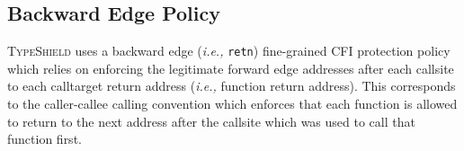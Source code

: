 \subsection{Backward Edge Policy}
\label{Backward Edge CFI Policy}
\textsc{TypeShield} uses a backward edge (\textit{i.e.,} \texttt{retn}) fine-grained CFI protection policy which 
relies on enforcing the legitimate forward edge addresses after each callsite
to each calltarget return address (\textit{i.e.,} function return address). 
This corresponds to the caller-callee calling convention 
which enforces that each function is allowed to return to the next address after the callsite which 
was used to call that function first. 

